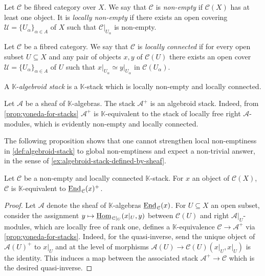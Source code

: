 \begin{definition}\label{def:non-empty}
	Let $\mathcal{C}$ be fibred category over $X$. We say that $\mathcal{C}$ is \textit{non-empty} if $\mathcal{C}(X)$ has at least one object. It is \textit{locally non-empty} if there exists an open covering $\mathscr{U} = \{U_{\alpha}\}_{\alpha\in A}$ of $X$ such that $\mathcal{C}\lvert_{U_{\alpha}}$ is non-empty. 
\end{definition}
\begin{definition}\label{def:locally-connected}
	Let $\mathcal{C}$ be a fibred category. We say that $\mathcal{C}$ is \textit{locally connected} if for every open subset $U \subseteq X$ and any pair of objects $x, y$ of $\mathcal{C}(U)$ there exists an open cover $\mathscr{U} = \{U_{\alpha}\}_{\alpha\in A}$ of $U$ such that $x\lvert_{U_{\alpha}} \simeq y\lvert_{U_{\alpha}}$ in $\mathcal{C}(U_{\alpha})$.
\end{definition}
\begin{definition}\label{def:algebroid-stack}
	A $\mathbb{K}$-\emph{algebroid stack} is a $\mathbb{K}$-stack which is locally non-empty and locally connected.
\end{definition}
\begin{example}\label{ex:algebroid-stack-defined-by-sheaf}
	Let $\mathscr{A}$ be a sheaf of $\mathbb{K}$-algebras. The stack $\mathscr{A}^{+}$ is an algebroid stack. Indeed, from \cref{prop:yoneda-for-stacks} $\mathscr{A}^{+}$ is $\mathbb{K}$-equivalent to the stack of locally free right $\mathscr{A}$-modules, which is evidently non-empty and locally connected.
\end{example}
The following proposition shows that one cannot strengthen local non-emptiness in \cref{def:algebroid-stack} to global non-emptiness and expect a non-trivial answer, in the sense of \cref{ex:algebroid-stack-defined-by-sheaf}.
\begin{proposition}\label{prop:non-empty-algebroid-stack-is-trivial}
	Let $\mathcal{C}$ be a non-empty and locally connected $\mathbb{K}$-stack. For $x$ an object of $\mathcal{C}(X)$, $\mathcal{C}$ is $\mathbb{K}$-equivalent to $\uEnd_{\mathcal{C}}(x)^{+}$.
\end{proposition}
\begin{proof}
	Let $\mathscr{A}$ denote the sheaf of $\mathbb{K}$-algebras $\uEnd_{\mathcal{C}}(x)$. For $U \subseteq X$ an open subset, consider the assignment $y \mapsto \uHom_{\mathcal{C}\lvert_{U}}(x\lvert_{U}, y)$ between $\mathcal{C}(U)$ and right $\mathscr{A}\lvert_{U}$-modules, which are locally free of rank one, defines a $\mathbb{K}$-equivalence $\mathcal{C} \to \mathscr{A}^{+}$ via \cref{prop:yoneda-for-stacks}. Indeed, for the quasi-inverse, send the unique object of $\mathscr{A}(U)^{+}$ to $x\lvert_{U}$ and at the level of morphisms $\mathscr{A}(U) \to \mathcal{C}(U)(x\lvert_{U}, x\lvert_{U})$ is the identity. This induces a map between the associated stack $\mathscr{A}^{+} \to \mathcal{C}$ which is the desired quasi-inverse.
\end{proof}
